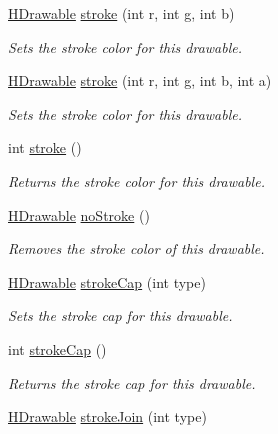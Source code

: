 \begin{DoxyCompactItemize}
\hyperlink{classhype_1_1drawable_1_1_h_drawable}{H\-Drawable} \hyperlink{classhype_1_1drawable_1_1_h_drawable_ac271a94299a2cfc04e999e474bd8e31e}{stroke} (int r, int g, int b)
\begin{DoxyCompactList}\small\item\em Sets the stroke color for this drawable. \end{DoxyCompactList}\item 
\hyperlink{classhype_1_1drawable_1_1_h_drawable}{H\-Drawable} \hyperlink{classhype_1_1drawable_1_1_h_drawable_af93bbe886c7d0b75eaab965d9a4b585c}{stroke} (int r, int g, int b, int a)
\begin{DoxyCompactList}\small\item\em Sets the stroke color for this drawable. \end{DoxyCompactList}\item 
int \hyperlink{classhype_1_1drawable_1_1_h_drawable_a71c0f994e78e4abca14513d48e014ee6}{stroke} ()
\begin{DoxyCompactList}\small\item\em Returns the stroke color for this drawable. \end{DoxyCompactList}\item 
\hyperlink{classhype_1_1drawable_1_1_h_drawable}{H\-Drawable} \hyperlink{classhype_1_1drawable_1_1_h_drawable_a7113d13660848a820f1d7661e16d34e8}{no\-Stroke} ()
\begin{DoxyCompactList}\small\item\em Removes the stroke color of this drawable. \end{DoxyCompactList}\item 
\hyperlink{classhype_1_1drawable_1_1_h_drawable}{H\-Drawable} \hyperlink{classhype_1_1drawable_1_1_h_drawable_a494dc825c3023645aedb917e1817b000}{stroke\-Cap} (int type)
\begin{DoxyCompactList}\small\item\em Sets the stroke cap for this drawable. \end{DoxyCompactList}\item 
int \hyperlink{classhype_1_1drawable_1_1_h_drawable_aa0881e861ef7eda3d2d554d64b63bfa6}{stroke\-Cap} ()
\begin{DoxyCompactList}\small\item\em Returns the stroke cap for this drawable. \end{DoxyCompactList}\item 
\hyperlink{classhype_1_1drawable_1_1_h_drawable}{H\-Drawable} \hyperlink{classhype_1_1drawable_1_1_h_drawable_a0b54f1607c1e0d5366f9f84b1ff0b761}{stroke\-Join} (int type)

\end{DoxyCompactItemize}
